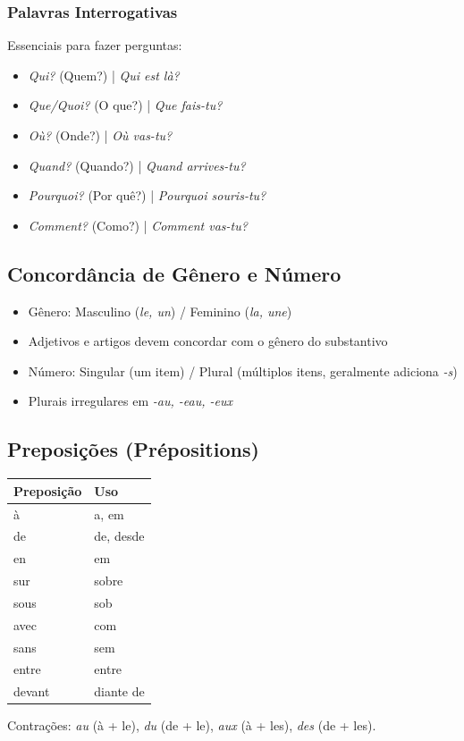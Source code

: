 \documentclass[a4paper,12pt]{article}
\begin{document}
\subsubsection{Palavras Interrogativas}
Essenciais para fazer perguntas:
\begin{itemize}
    \item \emph{Qui?} (Quem?) | \emph{Qui est là?}
    \item \emph{Que/Quoi?} (O que?) | \emph{Que fais-tu?}
    \item \emph{Où?} (Onde?) | \emph{Où vas-tu?}
    \item \emph{Quand?} (Quando?) | \emph{Quand arrives-tu?}
    \item \emph{Pourquoi?} (Por quê?) | \emph{Pourquoi souris-tu?}
    \item \emph{Comment?} (Como?) | \emph{Comment vas-tu?}
\end{itemize}

\subsection{Concordância de Gênero e Número}
\begin{itemize}
    \item Gênero: Masculino (\emph{le, un}) / Feminino (\emph{la, une})
    \item Adjetivos e artigos devem concordar com o gênero do substantivo
    \item Número: Singular (um item) / Plural (múltiplos itens, geralmente adiciona \emph{-s})
    \item Plurais irregulares em \emph{-au, -eau, -eux}
\end{itemize}

\subsection{Preposições (Prépositions)}
\begin{tabular}{ll}
    \toprule
    Preposição & Uso \\
    \midrule
    à & a, em \\
    de & de, desde \\
    en & em \\
    sur & sobre \\
    sous & sob \\
    avec & com \\
    sans & sem \\
    entre & entre \\
    devant & diante de \\
    \bottomrule
\end{tabular}
Contrações: \emph{au} (à + le), \emph{du} (de + le), \emph{aux} (à + les), \emph{des} (de + les).
\end{document}
